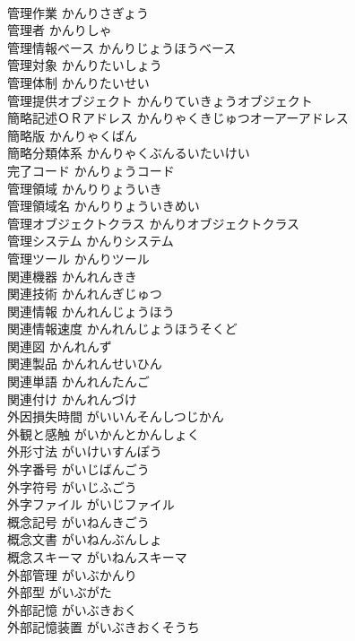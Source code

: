 \documentclass[8pt]{extreport}
\begin{document}
\begin{CJK}{UTF8}{min}
\\	管理作業	かんりさぎょう	
\\	管理者	かんりしゃ	
\\	管理情報ベース	かんりじょうほうベース	
\\	管理対象	かんりたいしょう	
\\	管理体制	かんりたいせい	
\\	管理提供オブジェクト	かんりていきょうオブジェクト	
\\	簡略記述ＯＲアドレス	かんりゃくきじゅつオーアーアドレス	
\\	簡略版	かんりゃくばん	
\\	簡略分類体系	かんりゃくぶんるいたいけい	
\\	完了コード	かんりょうコード	
\\	管理領域	かんりりょういき	
\\	管理領域名	かんりりょういきめい	
\\	管理オブジェクトクラス	かんりオブジェクトクラス	
\\	管理システム	かんりシステム	
\\	管理ツール	かんりツール	
\\	関連機器	かんれんきき	
\\	関連技術	かんれんぎじゅつ	
\\	関連情報	かんれんじょうほう	
\\	関連情報速度	かんれんじょうほうそくど	
\\	関連図	かんれんず	
\\	関連製品	かんれんせいひん	
\\	関連単語	かんれんたんご	
\\	関連付け	かんれんづけ	
\\	外因損失時間	がいいんそんしつじかん	
\\	外観と感触	がいかんとかんしょく	
\\	外形寸法	がいけいすんぽう	
\\	外字番号	がいじばんごう	
\\	外字符号	がいじふごう	
\\	外字ファイル	がいじファイル	
\\	概念記号	がいねんきごう	
\\	概念文書	がいねんぶんしょ	
\\	概念スキーマ	がいねんスキーマ	
\\	外部管理	がいぶかんり	
\\	外部型	がいぶがた	
\\	外部記憶	がいぶきおく	
\\	外部記憶装置	がいぶきおくそうち	

\end{CJK}
\end{document}
